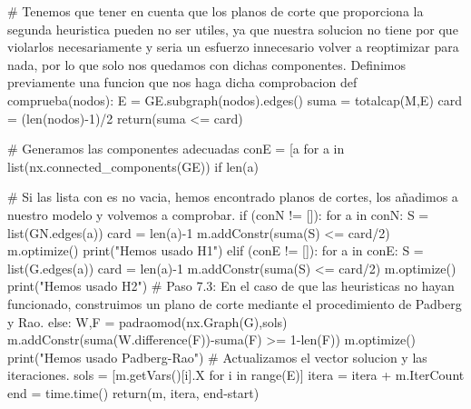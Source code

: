 \documentclass[twoside,a4paper,openright,12pt]{book}
\begin{document}
\begin{pythone}
        # Tenemos que tener en cuenta que los planos de corte que proporciona la segunda heuristica pueden no ser utiles, ya que nuestra solucion no tiene por que violarlos necesariamente y seria un esfuerzo innecesario volver a reoptimizar para nada, por lo que solo nos quedamos con dichas componentes. Definimos previamente una funcion que nos haga dicha comprobacion
        def comprueba(nodos):
            E = GE.subgraph(nodos).edges()
            suma = totalcap(M,E)
            card = (len(nodos)-1)/2
            return(suma <= card)
        
        # Generamos las componentes adecuadas
        conE = [a for a in list(nx.connected_components(GE)) if len(a) %

        # Si las lista con es no vacia, hemos encontrado planos de cortes, los añadimos a nuestro modelo y volvemos a comprobar. 
        if (conN != []):
            for a in conN:
                S = list(GN.edges(a))
                card = len(a)-1
                m.addConstr(suma(S) <= card/2) 
            m.optimize()
            print("Hemos usado H1")
        elif (conE != []):
            for a in conE:
                S = list(G.edges(a))
                card = len(a)-1
                m.addConstr(suma(S) <= card/2) 
            m.optimize()
            print("Hemos usado H2")
        # Paso 7.3: En el caso de que las heuristicas no hayan funcionado, construimos un plano de corte mediante el procedimiento de Padberg y Rao.
        else:        
            W,F = padraomod(nx.Graph(G),sols)
            m.addConstr(suma(W.difference(F))-suma(F) >= 1-len(F))
            m.optimize()
            print("Hemos usado Padberg-Rao")
        # Actualizamos el vector solucion y las iteraciones.
        sols = [m.getVars()[i].X for i in range(E)]
        itera = itera + m.IterCount
    end = time.time()
    return(m, itera, end-start)
\end{pythone}
\newpage
\end{document}
